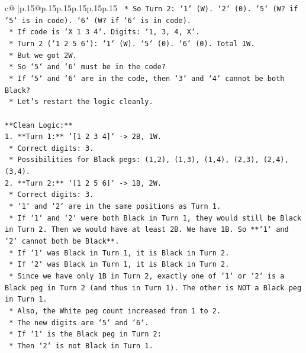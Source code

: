 \documentclass{article}
\begin{document}
{\begin{supertabular}{c@{$\;$}|p{.15\linewidth}@{}p{.15\linewidth}p{.15\linewidth}p{.15\linewidth}p{.15\linewidth}p{.15\linewidth}}
{{{\texttt{                            *   So Turn 2: `1` (W). `2` (0). `5` (W? if `5` is in code). `6` (W? if `6` is in code).} \\
\texttt{                            *   If code is `X 1 3 4`. Digits: `1, 3, 4, X`.} \\
\texttt{                            *   Turn 2 (`1 2 5 6`): `1` (W). `5` (0). `6` (0). Total 1W.} \\
\texttt{                            *   But we got 2W.} \\
\texttt{                            *   So `5` and `6` must be in the code?} \\
\texttt{                            *   If `5` and `6` are in the code, then `3` and `4` cannot be both Black?} \\
\texttt{                            *   Let's restart the logic cleanly.} \\
\\ 
\texttt{**Clean Logic:**} \\
\texttt{1.  **Turn 1:** `{[}1 2 3 4{]}` {-}> 2B, 1W.} \\
\texttt{    *   Correct digits: 3.} \\
\texttt{    *   Possibilities for Black pegs: (1,2), (1,3), (1,4), (2,3), (2,4), (3,4).} \\
\texttt{2.  **Turn 2:** `{[}1 2 5 6{]}` {-}> 1B, 2W.} \\
\texttt{    *   Correct digits: 3.} \\
\texttt{    *   `1` and `2` are in the same positions as Turn 1.} \\
\texttt{    *   If `1` and `2` were both Black in Turn 1, they would still be Black in Turn 2. Then we would have at least 2B. We have 1B. So **`1` and `2` cannot both be Black**.} \\
\texttt{    *   If `1` was Black in Turn 1, it is Black in Turn 2.} \\
\texttt{    *   If `2` was Black in Turn 1, it is Black in Turn 2.} \\
\texttt{    *   Since we have only 1B in Turn 2, exactly one of `1` or `2` is a Black peg in Turn 2 (and thus in Turn 1). The other is NOT a Black peg in Turn 1.} \\
\texttt{    *   Also, the White peg count increased from 1 to 2.} \\
\texttt{    *   The new digits are `5` and `6`.} \\
\texttt{    *   If `1` is the Black peg in Turn 2:} \\
\texttt{        *   Then `2` is not Black in Turn 1.} \\
}}}
\end{supertabular}}
\end{document}
